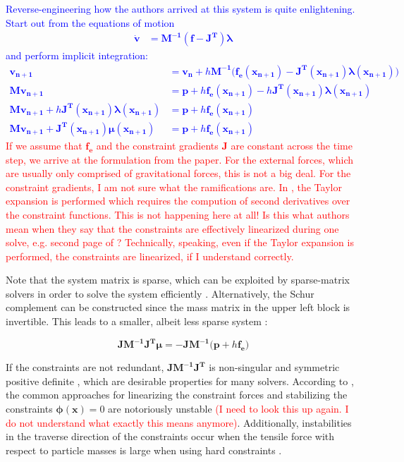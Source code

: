 \textcolor{blue}{Reverse-engineering how the authors arrived at this system is quite enlightening. Start out from the equations of motion 
\cite{ascher1995}
    \begin{align*}
        \dot{\bm{v}} &= \bm{M^{-1}(f - J^T) \lambda}
    \end{align*}
    and perform implicit integration:
    \begin{align*}
        \bm{v_{n+1}} &= \bm{v_n} + h\bm{M^{-1}(f_e(x_{n+1})} - \bm{J^T(x_{n+1})\lambda(x_{n+1}))} \\
        \bm{Mv_{n+1}} &= \bm{p} + h\bm{f_e(x_{n+1})} - h\bm{J^T(x_{n+1})\lambda(x_{n+1})} \\ 
        \bm{Mv_{n+1}} + h\bm{J^T(x_{n+1})\lambda(x_{n+1})} &= \bm{p} + h\bm{f_e(x_{n+1})} \\ 
        \bm{Mv_{n+1}} + \bm{J^T(x_{n+1}) \mu(x_{n+1})} &= \bm{p} + h\bm{f_e(x_{n+1})}
    \end{align*}
}
\textcolor{red}{If we assume that $\bm{f_e}$ and the constraint gradients $\bm{J}$ are constant across the time step, we arrive at the 
formulation from the paper. For the external forces, which are usually only comprised of gravitational forces, this is not a big 
deal. For the constraint gradients, I am not sure what the ramifications are. In \cite{baraff1998}, the Taylor expansion is performed
which requires the compution of second derivatives over the constraint functions. This is not happening here at all! Is this what 
authors mean when they say that the constraints are effectively linearized during one solve, e.g. second page 
of \cite{mueller2020}? Technically, speaking, even if the Taylor expansion is performed, the constraints are linearized, if I 
understand correctly.}

Note that the system matrix is sparse, which can be exploited by sparse-matrix solvers in order to solve the system efficiently
\cite{baraff1996}. Alternatively, the Schur complement can be constructed since the mass matrix in the upper left block is invertible.
This leads to a smaller, albeit less sparse system \cite{tournier2015}:

\[
    \bm{JM^{-1}J^T \mu} = \bm{-JM^{-1}(p + } h \bm{f_e)}
\]

If the constraints are not redundant, $\bm{JM^{-1}J^T}$ is non-singular and symmetric positive definite \cite{baraff1996}, which are desirable
properties for many solvers. According to \cite{servin2006}, the common approaches for linearizing the constraint forces and stabilizing 
the constraints $\bm{\phi(x)} = 0$ are notoriously unstable \textcolor{red}{(I need to look this up again. I do not understand what exactly 
this means anymore)}. Additionally, instabilities in the traverse direction of the constraints occur when the tensile force with respect to 
particle masses is large when using hard constraints \cite{tournier2015}.

